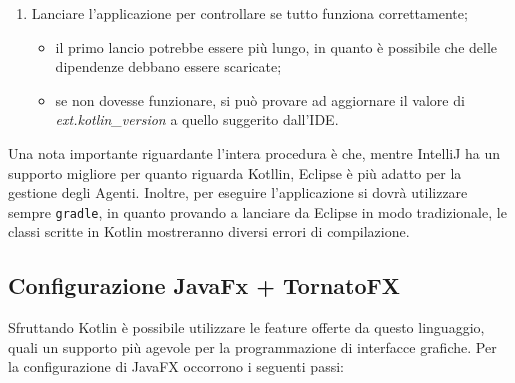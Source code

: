 \documentclass[12pt,a4paper,openright,oneside]{report}
\begin{document}
\begin{enumerate}
	\item Lanciare l'applicazione per controllare se tutto funziona correttamente;
	\begin{itemize}
		\item il primo lancio potrebbe essere più lungo, in quanto è possibile che delle dipendenze debbano essere scaricate;
		\item se non dovesse funzionare, si può provare ad aggiornare il valore di \textit{ext.kotlin\_version} a quello suggerito dall'IDE.
	\end{itemize}
\end{enumerate}

Una nota importante riguardante l'intera procedura è che, mentre IntelliJ ha un supporto migliore per quanto riguarda Kotllin, Eclipse è più adatto per la gestione degli Agenti. Inoltre, per eseguire l'applicazione si dovrà utilizzare sempre \texttt{gradle}, in quanto provando a lanciare da Eclipse in modo tradizionale, le classi scritte in Kotlin mostreranno diversi errori di compilazione.


\subsection{Configurazione JavaFx + TornatoFX}
Sfruttando Kotlin è possibile utilizzare le feature offerte da questo linguaggio, quali un supporto più agevole per la programmazione di interfacce grafiche. Per la configurazione di JavaFX occorrono i seguenti passi:
\end{document}
